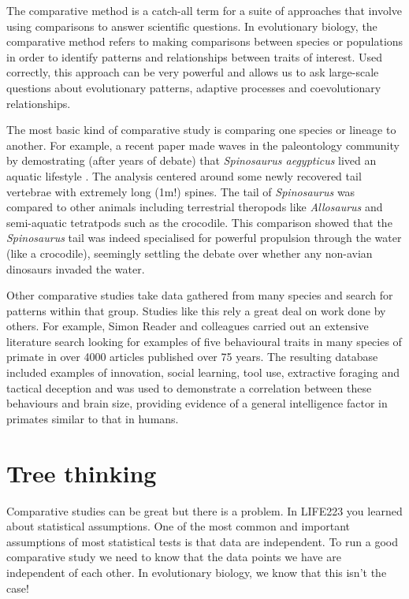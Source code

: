 \documentclass[
]{book}
\begin{document}
The comparative method is a catch-all term for a suite of approaches that involve using comparisons to answer scientific questions. In evolutionary biology, the comparative method refers to making comparisons between species or populations in order to identify patterns and relationships between traits of interest. Used correctly, this approach can be very powerful and allows us to ask large-scale questions about evolutionary patterns, adaptive processes and coevolutionary relationships.

The most basic kind of comparative study is comparing one species or lineage to another. For example, a recent paper made waves in the paleontology community by demostrating (after years of debate) that \emph{Spinosaurus aegypticus} lived an aquatic lifestyle \citep{Ibrahim20}. The analysis centered around some newly recovered tail vertebrae with extremely long (1m!) spines. The tail of \emph{Spinosaurus} was compared to other animals including terrestrial theropods like \emph{Allosaurus} and semi-aquatic tetratpods such as the crocodile. This comparison showed that the \emph{Spinosaurus} tail was indeed specialised for powerful propulsion through the water (like a crocodile), seemingly settling the debate over whether any non-avian dinosaurs invaded the water.

Other comparative studies take data gathered from many species and search for patterns within that group. Studies like this rely a great deal on work done by others. For example, Simon Reader and colleagues \citeyearpar{Reader11} carried out an extensive literature search looking for examples of five behavioural traits in many species of primate in over 4000 articles published over 75 years. The resulting database included examples of innovation, social learning, tool use, extractive foraging and tactical deception and was used to demonstrate a correlation between these behaviours and brain size, providing evidence of a general intelligence factor in primates similar to that in humans.

\hypertarget{tree-thinking}{%
\section{Tree thinking}\label{tree-thinking}}

Comparative studies can be great but there is a problem. In LIFE223 you learned about statistical assumptions. One of the most common and important assumptions of most statistical tests is that data are independent. To run a good comparative study we need to know that the data points we have are independent of each other. In evolutionary biology, we know that this isn't the case!
\end{document}

